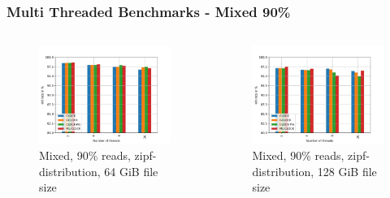 \documentclass[
	aspectratio=169,
	compress,
]{beamer}
\newcommand{\navframetitle}[1]{\frametitle{#1\hfill{\footnotesize\lastsection{}}}}
\begin{document}
\begin{frame}[fragile]
	\navframetitle{Multi Threaded Benchmarks - Mixed 90\%}

	\begin{columns}
		\begin{column}{0.5\textwidth}
			\begin{figure}[ht]
    			\centering
    			\includegraphics[width=\textwidth]{multi_64_gb_rw_90to10_zipf.jpg}
        		\caption{Mixed, 90\% reads, zipf-distribution, 64 GiB file size}
			\end{figure}
		\end{column}
		\begin{column}{0.5\textwidth}
			\begin{figure}[ht]
    			\centering
    			\includegraphics[width=\textwidth]{multi_128_gb_rw_90to10_zipf.jpg}
        		\caption{Mixed, 90\% reads, zipf-distribution, 128 GiB file size}
			\end{figure}			
		\end{column}
	\end{columns}
\end{frame}
\end{document}
